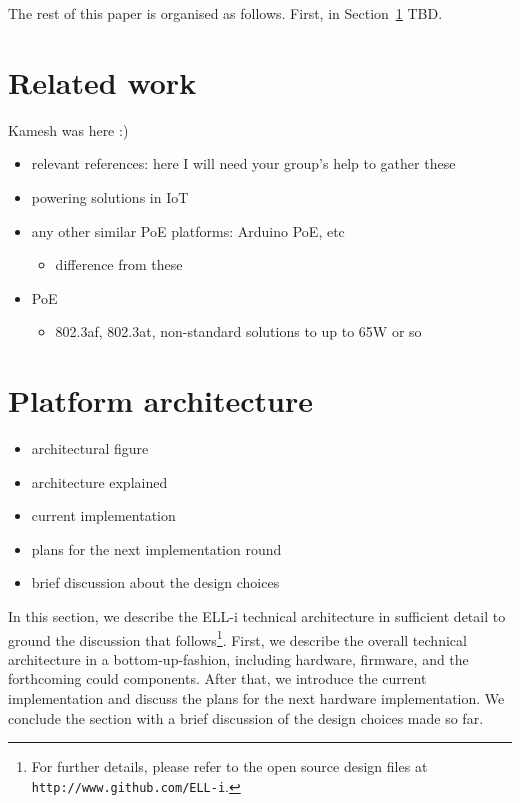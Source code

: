 \documentclass[draft,a4paper]{siamltex}
\begin{document}
The rest of this paper is organised as follows.  First, in
Section~\ref{sec:related} TBD.
 

\section{Related work}
\label{sec:related}

Kamesh was here :)

\begin{itemize}
  \item relevant references: here I will need your group's help to gather these
  \item powering solutions in IoT
  \item any other similar PoE platforms: Arduino PoE, etc
    \begin{itemize}
    \item difference from these
    \end{itemize}
  \item PoE
    \begin{itemize}
    \item 802.3af, 802.3at, non-standard solutions to up to 65W or so
    \end{itemize}
\end{itemize}
 

\section{Platform architecture}
\label{sec:architecture}

\begin{itemize}
  \item architectural figure
  \item architecture explained
  \item current implementation
  \item plans for the next implementation round
  \item brief discussion about the design choices
\end{itemize}

In this section, we describe the ELL-i technical architecture in
sufficient detail to ground the discussion that follows\footnote{For further
details, please refer to the open source design files at
\hbox{\tt http://www.github.com/ELL-i}.}.
First, we describe the overall technical architecture in a
bottom-up-fashion, including hardware, firmware, and the forthcoming
could components.  After that, we introduce the current
implementation and discuss the plans for the next hardware implementation.  We
conclude the section with a brief discussion of the design choices
made so far.
\end{document}
